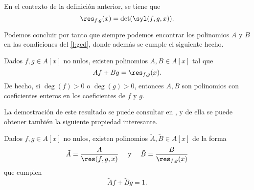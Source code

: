 \begin{proposicion}
    En el contexto de la definición anterior, se tiene que 
    \begin{equation*}
        \res_{f,g}(x) = \det(\syl(f,g,x)).
    \end{equation*}
\end{proposicion}
Podemos concluir por tanto que siempre podemos encontrar los polinomios $A$ y $B$ en las condiciones del \autoref{l:gcd}, donde además se cumple el siguiente hecho.
\begin{proposicion}
    Dados $f,g\in A[x]$ no nulos, existen polinomios $A,B\in A[x]$ tal que  
    $$Af+Bg = \res_{f,g}(x).$$
    De hecho, si $\deg(f)>0$ o $\deg(g)>0$, entonces $A,B$ son polinomios con coeficientes enteros en los coeficientes de $f$ y $g$.
\end{proposicion}
La demostración de este resultado se puede consultar en \cite{ideals_varieties}, y de ella se puede obtener también la siguiente propiedad interesante.
\begin{proposicion}
    Dados $f,g\in A[x]$ no nulos, existen polinomios $\tilde{A}, \tilde{B} \in A[x]$ de la forma
    \begin{equation*}
        \tilde{A} = \frac{A}{\res(f,g,x)}\quad \text{ y }\quad \tilde{B} = \frac{B}{\res_{f,g}(x)}
    \end{equation*}
    que cumplen
    \begin{equation*}
        \tilde{A}f + \tilde{B}g = 1.
    \end{equation*}
\end{proposicion}



